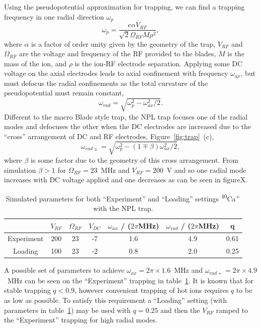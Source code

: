 \documentclass[12pt]{iopart}
\begin{document}
Using the pseudopotential approximation for trapping, we can find a trapping frequency in one radial direction $\omega_p$
$$\omega_p = \frac{e\alpha V_{RF}}{\sqrt{2}\Omega_{RF}M\rho^2},$$
where $\alpha$ is a factor of order unity given by the geometry of the trap, $V_{RF}$ and $\Omega_{RF}$ are the voltage and frequency of the RF provided to the blades, $M$ is the mass of the ion, and $\rho$ is the ion-RF electrode separation.
Applying some DC voltage on the axial electrodes leads to axial confinement with frequency $\omega_{ax}$, but must defocus the radial confinements as the total curvature of the pseudopotential must remain constant,
$$\omega_{rad} = \sqrt{\omega_p^2 - \omega_{ax}^2/2}.$$
Different to the macro Blade style trap, the NPL trap focuses one of
the radial modes and defocuses the other when the DC electrodes are
increased due to the ``cross'' arrangement of DC and RF electrodes,
Figure~\ref{fig:trap}~(c),
$$\omega_{rad\pm} = \sqrt{\omega_p^2 - (1\mp\beta)\omega_{ax}^2/2},$$
where $\beta$ is some factor due to the geometry of this cross arrangement. From simulation $\beta > 1$ for $\Omega_{RF} = 23$~MHz and $V_{RF} = 200$~V and so one radial mode increases with DC voltage applied and one decreases as can be seen in figureX.
\begin{table}[h!]
\begin{center}
\begin{tabular}{ c|c c c c c c }
   & $V_{RF}$ & $\Omega_{RF}$& $V_{DC}$ & $\omega_{ax}$ / ($2\pi$MHz) & $\omega_{rad}$ / ($2\pi$MHz) & q \\ 
  \hline
  Experiment  & 200 & 23 & -7 & 1.6 & 4.9 & 0.61 \\
  Loading  & 100 & 23 & -2 & 0.8 & 2.0 & 0.25 \\
\end{tabular}
\caption{ Simulated parameters for both ``Experiment'' and ``Loading'' settings \textsuperscript{40}Ca\textsuperscript{+} with the NPL trap.
  }
\end{center}
\label{table:freqs}
\end{table}
A possible set of parameters to achieve $\omega_{ax} = 2\pi \times
1.6$~MHz and $\omega_{rad+} = 2\pi \times 4.9$~MHz can be seen on the
``Experiment'' trapping in table~\ref{table:freqs}. It is known that
for stable trapping $q < 0.9$, however convenient trapping of hot ions
requires $q$ to be as low as possible. To satisfy this requirement a
``Loading'' setting (with parameters in table~\ref{table:freqs}) may
be used with $q = 0.25$ and then the $V_{RF}$ ramped to the
``Experiment'' trapping for high radial modes. 
\end{document}
